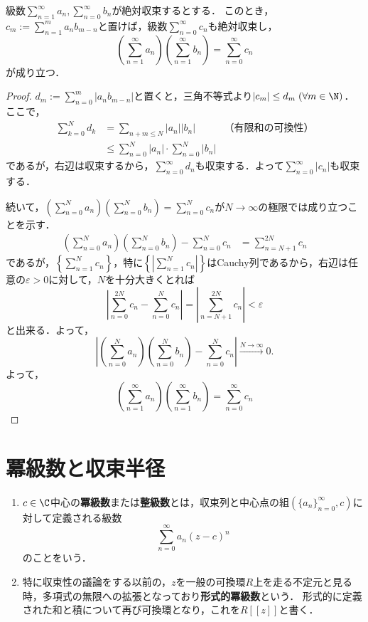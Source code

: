 \documentclass[uplatex, dvipdfmx]{jsreport}
\begin{document}
\begin{proposition}[無限和についての分配法則]\label{prop-distributive-law-for-infinite}
    級数$\sum^\infty_{n=1}a_n,\sum^\infty_{n=0}b_n$が絶対収束するとする．
    このとき，$c_m:=\sum^m_{n=1}a_nb_{m-n}$と置けば，級数$\sum^\infty_{n=0}c_n$も絶対収束し，
    \[ \left(\sum^\infty_{n=1}a_n\right)\left(\sum^\infty_{n=1}b_n\right)=\sum^\infty_{n=0}c_n \]
    が成り立つ．
\end{proposition}
\begin{proof}
    $d_m:=\sum^m_{n=0}|a_nb_{m-n}|$と置くと，三角不等式より$|c_m|\le d_m\;(\forall m\in\N)$．
    ここで，
    \begin{align*}
        \sum^N_{k=0}d_k&=\sum_{n+m\le N}|a_n||b_n|&（有限和の可換性）\\
        &\le\sum^N_{n=0}|a_n|\cdot\sum^N_{n=0}|b_n|
    \end{align*}
    であるが，右辺は収束するから，$\sum^\infty_{n=0}d_n$も収束する．よって$\sum^\infty_{n=0}|c_n|$も収束する．

    続いて，$\left(\sum^N_{n=0}a_n\right)\left(\sum^N_{n=0}b_n\right)=\sum^N_{n=0}c_n$が$N\to\infty$の極限では成り立つことを示す．
    \begin{align*}
        \left(\sum^N_{n=0}a_n\right)\left(\sum^N_{n=0}b_n\right)-\sum^N_{n=0}c_n&=\sum^{2N}_{n=N+1}c_n
    \end{align*}
    であるが，$\left\{\sum^N_{n=1}c_n\right\}$，特に$\left\{\left|\sum^N_{n=1}c_n\right|\right\}$はCauchy列であるから，右辺は任意の$\varepsilon>0$に対して，$N$を十分大きくとれば
    \[\left|\sum^{2N}_{n=0}c_n-\sum^{N}_{n=0}c_n\right|=\left|\sum^{2N}_{n=N+1}c_n\right|<\varepsilon\]
    と出来る．よって，
    \[\left|\left(\sum^N_{n=0}a_n\right)\left(\sum^N_{n=0}b_n\right)-\sum^N_{n=0}c_n\right|\xrightarrow{N\to\infty} 0.\]
    よって，
    \[\left(\sum^\infty_{n=1}a_n\right)\left(\sum^\infty_{n=1}b_n\right)=\sum^\infty_{n=0}c_n\]
\end{proof}

\section{冪級数と収束半径}

\begin{definition}\mbox{}
    \begin{enumerate}
        \item $c\in\C$中心の\textbf{冪級数}または\textbf{整級数}とは，収束列と中心点の組$(\{a_n\}_{n=0}^\infty,c)$に対して定義される級数
        \[ \sum^\infty_{n=0}a_n(z-c)^n \]
        のことをいう．
        \item 特に収束性の議論をする以前の，$z$を一般の可換環$R$上を走る不定元と見る時，多項式の無限への拡張となっており\textbf{形式的冪級数}という．
        形式的に定義された和と積について再び可換環となり，これを$R[[z]]$と書く．
    \end{enumerate}
\end{definition}
\end{document}

